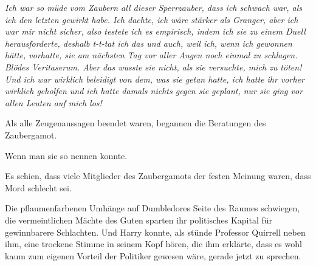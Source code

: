 \emph{Ich war so müde vom Zaubern all dieser Sperrzauber, dass ich schwach war, als ich den letzten gewirkt habe. Ich dachte, ich wäre stärker als Granger, aber ich war mir nicht sicher, also testete ich es empirisch, indem ich sie zu einem Duell herausforderte, deshalb t-t-tat ich das und auch, weil ich, wenn ich gewonnen hätte, vorhatte, sie am nächsten Tag vor aller Augen noch einmal zu schlagen. Blödes Veritaserum. Aber das wusste \emph{sie} nicht, als sie versuchte, mich zu \emph{töten}! Und ich war wirklich beleidigt von dem, was sie getan hatte, ich hatte ihr vorher wirklich geholfen und ich hatte damals nichts gegen sie geplant, nur \emph{sie} ging vor allen Leuten auf \emph{mich} los!}

Als alle Zeugenaussagen beendet waren, begannen die Beratungen des Zaubergamot.

Wenn man sie so nennen konnte.

Es schien, dass viele Mitglieder des Zaubergamots der festen Meinung waren, dass Mord schlecht sei.

Die pflaumenfarbenen Umhänge auf Dumbledores Seite des Raumes schwiegen, die vermeintlichen Mächte des Guten sparten ihr politisches Kapital für gewinnbarere Schlachten. Und Harry konnte, als stünde Professor Quirrell neben ihm, eine trockene Stimme in seinem Kopf hören, die ihm erklärte, dass es wohl kaum zum eigenen Vorteil der Politiker gewesen wäre, gerade jetzt zu sprechen.

